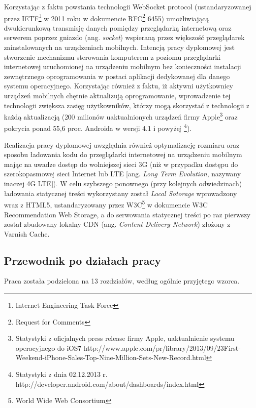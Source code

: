 Korzystając z faktu powstania technologii WebSocket protocol (ustandaryzowanej przez IETF\footnote{Internet Engineering Task Force} w 2011 roku w dokumencie RFC\footnote{Request for Comments} 6455\cite{websockets-rfc}) umożliwiającą dwukierunkową transmisję danych pomiędzy przeglądarką internetową oraz serwerem poprzez gniazdo (ang. \emph{socket})  wspieraną przez większość przeglądarek zainstalowanych na urządzeniach mobilnych. Intencją pracy dyplomowej jest stworzenie mechanizmu sterowania komputerem z poziomu przeglądarki internetowej uruchomionej na urządzeniu mobilnym bez konieczności instalacji zewnętrznego oprogramowania w postaci aplikacji dedykowanej dla danego systemu operacyjnego. Korzystając również z faktu, iż aktywni użytkownicy urządzeń mobilnych chętnie aktualizują oprogramowanie, wprowadzenie tej technologii zwiększa zasięg użytkowników, którzy mogą skorzystać z technologii z każdą aktualizacją (200 milionów uaktualnionych urządzeń firmy Apple\footnote{Statystyki z oficjalnych press release firmy Apple, uaktualnienie systemu operacyjnego do iOS7 http://www.apple.com/pr/library/2013/09/23First-Weekend-iPhone-Sales-Top-Nine-Million-Sets-New-Record.html} oraz pokrycia ponad 55,6 proc. Androida w wersji 4.1 i powyżej \footnote{Statystyki z dnia 02.12.2013 r. http://developer.android.com/about/dashboards/index.html}).

Realizacja pracy dyplomowej uwzględnia również optymalizację rozmiaru oraz sposobu ładowania kodu do przeglądarki internetowej na urządzeniu mobilnym mając na uwadze dostęp do wolniejszej sieci 3G (niż w przypadku dostępu do szerokopasmowej sieci Internet lub LTE [ang. \emph{Long Term Evolution}, nazywany inaczej 4G LTE]). W celu szybszego ponownego (przy kolejnych odwiedzinach) ładowania statycznej treści wykorzystany został \emph{Local Sotorage}\cite{webstorage} wprowadzony wraz z HTML5, ustandaryzowany przez W3C\footnote{World Wide Web Consortium} w dokumencie W3C Recommendation Web Storage, a do serwowania statycznej treści po raz pierwszy został zbudowany lokalny CDN (ang. \emph{Content Delivery Network}) złożony z Varnish Cache.

\subsection{Przewodnik po działach pracy}

Praca została podzielona na 13 rozdziałów, według ogólnie przyjętego wzorca. 

\par

